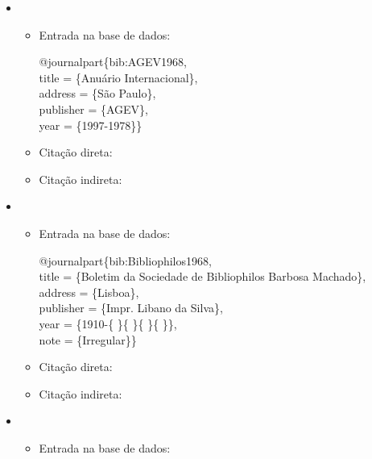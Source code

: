 \documentclass[a4paper,12pt,oneside,onecolumn]{uerj}
\newcommand{\formato}[1]{\begin{flushleft}{#1}\end{flushleft}}
\begin{document}
\begin{itemize}[label={Ex.:},leftmargin=\parindent,parsep=0pt,itemsep=0pt]
  \item \formato{\citetext{bib:AGEV1968}}

  \begin{itemize}[leftmargin=*,parsep=0pt,itemsep=0pt]
    \item Entrada na base de dados:

    \formato{
      @journalpart\{bib:AGEV1968,\\
      title = \{Anu{\'a}rio Internacional\},\\
      address = \{S{\~a}o Paulo\},\\
      publisher = \{AGEV\},\\
      year = \{1997-1978\}\}\\
    }

    \item Citação direta: 
    \item Citação indireta: \cite{bib:AGEV1968}\\
  \end{itemize}

  \item \formato{\citetext{bib:Bibliophilos1968}}

  \begin{itemize}[leftmargin=*,parsep=0pt,itemsep=0pt]
    \item Entrada na base de dados:

    \formato{
      @journalpart\{bib:Bibliophilos1968,\\
      title = \{Boletim da Sociedade de Bibliophilos Barbosa Machado\},\\
      address = \{Lisboa\},\\
      publisher = \{Impr. Libano da Silva\},\\
      year = \{1910-\{ \}\{ \}\{ \}\{ \}\},\\
      note = \{Irregular\}\}\\
    }

    \item Citação direta: 
    \item Citação indireta: \cite{bib:Bibliophilos1968}\\
  \end{itemize}

  \item \formato{\citetext{bib:RevistaRio1985}}

  \begin{itemize}[leftmargin=*,parsep=0pt,itemsep=0pt]
    \item Entrada na base de dados:


\end{itemize}
\end{itemize}
\end{document}
